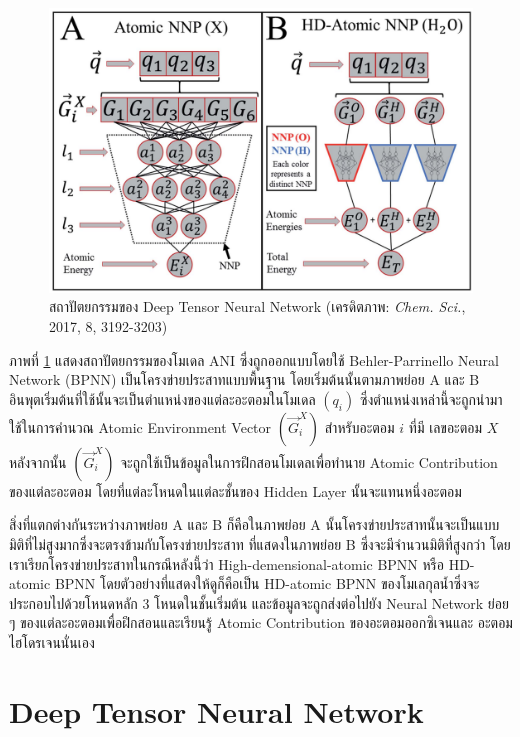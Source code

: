\begin{figure}[H]
    \centering
    \includegraphics[width=0.9\linewidth]{fig/ani_bpnn.png}
    \caption{สถาปัตยกรรมของ Deep Tensor Neural Network (เครดิตภาพ: \textit{Chem. Sci.}, 2017, 8, 3192-3203)}
    \label{fig:ani_bpnn_architect}
\end{figure}

ภาพที่ \ref{fig:ani_bpnn_architect} แสดงสถาปัตยกรรมของโมเดล ANI ซึ่งถูกออกแบบโดยใช้ Behler-Parrinello Neural Network 
(BPNN) เป็นโครงข่ายประสาทแบบพื้นฐาน โดยเริ่มต้นนั้นตามภาพย่อย A และ B อินพุตเริ่มต้นที่ใช้นั้นจะเป็นตำแหน่งของแต่ละอะตอมในโมเดล 
$(q_{i})$ ซึ่งตำแหน่งเหล่านี้จะถูกนำมาใช้ในการคำนวณ Atomic Environment Vector $(\vec{G}^{X}_{i})$ สำหรับอะตอม $i$ ที่มี%
เลขอะตอม $X$ หลังจากนั้น $(\vec{G}^{X}_{i})$ จะถูกใช้เป็นข้อมูลในการฝึกสอนโมเดลเพื่อทำนาย Atomic Contribution ของแต่ละอะตอม 
โดยที่แต่ละโหนดในแต่ละชั้นของ Hidden Layer นั้นจะแทนหนึ่งอะตอม

สิ่งที่แตกต่างกันระหว่างภาพย่อย A และ B ก็คือในภาพย่อย A นั้นโครงข่ายประสาทนั้นจะเป็นแบบมิติที่ไม่สูงมากซึ่งจะตรงข้ามกับโครงข่ายประสาท%
ที่แสดงในภาพย่อย B ซึ่งจะมีจำนวนมิติที่สูงกว่า โดยเราเรียกโครงข่ายประสาทในกรณีหลังนี้ว่า High-demensional-atomic BPNN หรือ 
HD-atomic BPNN โดยตัวอย่างที่แสดงให้ดูก็คือเป็น HD-atomic BPNN ของโมเลกุลน้ำซึ่งจะประกอบไปด้วยโหนดหลัก 3 โหนดในชั้นเริ่มต้น 
และข้อมูลจะถูกส่งต่อไปยัง Neural Network ย่อย ๆ ของแต่ละอะตอมเพื่อฝึกสอนและเรียนรู้ Atomic Contribution ของอะตอมออกซิเจนและ%
อะตอมไฮโดรเจนนั่นเอง

\section{Deep Tensor Neural Network}
\label{sec:dtnn}

